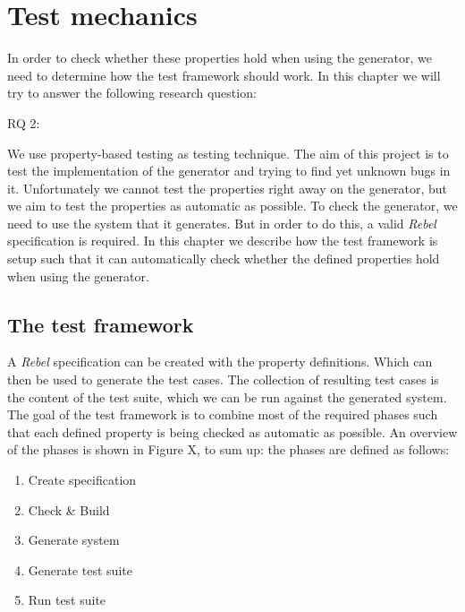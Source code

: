 \chapter{Test mechanics}
\label{cpt:testmechanics}
In order to check whether these properties hold when using the generator, we
need to determine how the test framework should work. In this chapter we will
try to answer the following research question:
\begin{description}
  \item [RQ 2:] \rqTwo
\end{description}

We use property-based testing as testing technique. The aim of this project is
to test the implementation of the generator and trying to find yet unknown bugs
in it. Unfortunately we cannot test the properties right away on the generator,
but we aim to test the properties as automatic as possible. To check the
generator, we need to use the system that it generates. But in order to do this,
a valid \textit{Rebel} specification is required. In this chapter we describe
how the test framework is setup such that it can automatically check whether the
defined properties hold when using the generator.

\section{The test framework}
A \textit{Rebel} specification can be created with the property definitions.
Which can then be used to generate the test cases. The collection of resulting
test cases is the content of the test suite, which we can be run against the
generated system. The goal of the test framework is to combine most of the
required phases such that each defined property is being checked as automatic as
possible. An overview of the phases is shown in Figure X, to sum up: the phases
are defined as follows:
\def \tfPhaseOne{Create specification}
\def \tfPhaseTwo{Check \& Build}
\def \tfPhaseThree{Generate system}
\def \tfPhaseFour{Generate test suite}
\def \tfPhaseFive{Run test suite}
\begin{enumerate}
  \item \tfPhaseOne{}
  \item \tfPhaseTwo{}
  \item \tfPhaseThree{}
  \item \tfPhaseFour{}
  \item \tfPhaseFive{}
\end{enumerate}

